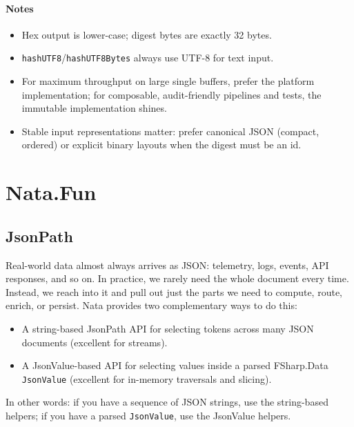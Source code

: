 \documentclass{article}
\begin{document}
\paragraph{Notes}
\begin{itemize}
  \item Hex output is lower-case; digest bytes are exactly 32 bytes.
  \item \texttt{hashUTF8}/\texttt{hashUTF8Bytes} always use UTF-8 for text input.
  \item For maximum throughput on large single buffers, prefer the platform implementation; for composable, audit-friendly pipelines and tests, the immutable implementation shines.
  \item Stable input representations matter: prefer canonical JSON (compact, ordered) or explicit binary layouts when the digest must be an id.
\end{itemize}

\clearpage
\section{Nata.Fun}

\subsection{JsonPath}

Real-world data almost always arrives as JSON: telemetry, logs, events, API responses, and so on. In practice, we rarely need the whole document every time. Instead, we reach into it and pull out just the parts we need to compute, route, enrich, or persist. Nata provides two complementary ways to do this:

\begin{itemize}
  \item A string-based JsonPath API for selecting tokens across many JSON documents (excellent for streams).
  \item A JsonValue-based API for selecting values inside a parsed FSharp.Data \texttt{JsonValue} (excellent for in-memory traversals and slicing).
\end{itemize}

In other words: if you have a sequence of JSON strings, use the string-based helpers; if you have a parsed \texttt{JsonValue}, use the JsonValue helpers.
\end{document}
